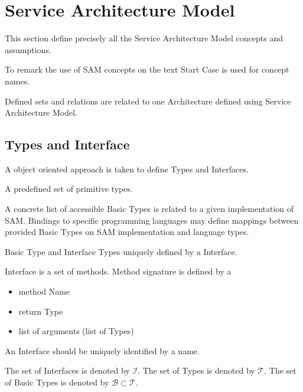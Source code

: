 \newpage
\section{Service Architecture Model}
\label{sec:samModel}
This section define precisely all the Service Architecture Model concepts and assumptions.

To remark the use of SAM concepts on the text Start Case is used for concept names.

Defined sets and relations are related to one Architecture defined using Service Architecture Model.

\subsection{Types and Interface}

A object oriented approach is taken to define Types and Interfaces.

\begin{defi}
  A predefined set of primitive types.
\end{defi}

A concrete list of accessible Basic Types is related to a given implementation of SAM. Bindings to specific programming languages may define mappings between provided Basic Types on SAM implementation and language types.

\begin{defi}[Type]
  Basic Type and Interface Types uniquely defined by a Interface.
\end{defi}

\begin{defi}[Interface]
  Interface is a set of methods. Method signature is defined by a
\begin{itemize}
 \item method Name
 \item return Type
 \item list of arguments (list of Types)
\end{itemize}
\end{defi}

An Interface should be uniquely identified by a name.



The set of Interfaces is denoted by $\mathcal{I}$. The set of Types is denoted by $\mathcal{T}$. The set of Basic Types is denoted by $\mathcal{B}\subset\mathcal{T}$.

